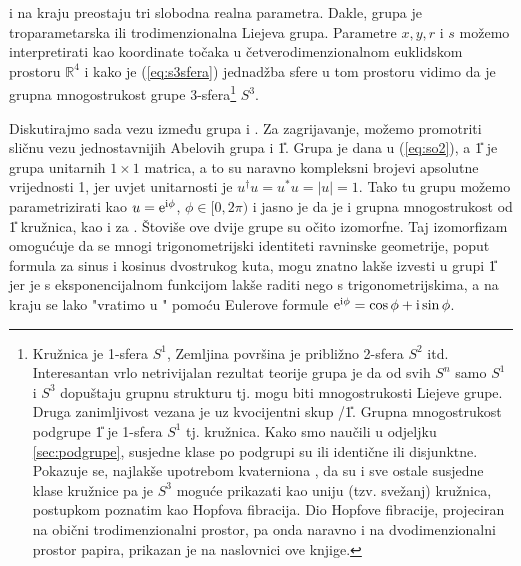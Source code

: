 i na kraju preostaju tri slobodna realna parametra. Dakle, grupa  je troparametarska
ili trodimenzionalna Liejeva grupa. Parametre $x, y, r$ i $s$ možemo interpretirati
kao koordinate točaka u četverodimenzionalnom euklidskom prostoru $\mathbb{R}^4$
i kako je (\ref{eq:s3sfera}) jednadžba sfere u tom prostoru vidimo da je
grupna mnogostrukost grupe  3-sfera\footnote{Kružnica je 1-sfera $S^1$,
    
    Zemljina površina je približno 2-sfera $S^2$ itd. Interesantan vrlo
    netrivijalan rezultat teorije grupa je da od svih $S^n$ samo $S^1$ i $S^3$ dopuštaju
grupnu strukturu tj. mogu biti mnogostrukosti Liejeve grupe.
Druga zanimljivost vezana je uz kvocijentni skup /\U{1}. Grupna mnogostrukost
podgrupe \U{1} je 1-sfera $S^1$ tj. kružnica. 
Kako smo naučili u odjeljku \ref{sec:podgrupe},
susjedne klase po podgrupi su ili identične ili disjunktne. Pokazuje se,
najlakše upotrebom kvaterniona \cite{Stilwell:2008}, da su i sve ostale
susjedne klase kružnice pa je $S^3$ moguće prikazati kao uniju (tzv. svežanj)
  
kružnica, postupkom poznatim kao Hopfova fibracija. Dio Hopfove fibracije,
projeciran na obični trodimenzionalni prostor, pa onda naravno i na
dvodimenzionalni prostor papira, prikazan je na naslovnici ove knjige.} $S^3$.


Diskutirajmo sada vezu između grupa  i . Za zagrijavanje, možemo
promotriti sličnu vezu jednostavnijih Abelovih grupa  i \U{1}. Grupa  je dana
u (\ref{eq:so2}), a \U{1} je grupa unitarnih $1 \times 1$ 
matrica, a to su naravno kompleksni brojevi apsolutne vrijednosti 1, jer uvjet
unitarnosti je $u^\dagger u = u^* u = |u| = 1$. Tako tu grupu možemo
parametrizirati kao $u = \textrm{e}^{\textrm{i}\phi}$, $\phi\in [0, 2\pi)$ i jasno je da je
i grupna mnogostrukost od \U{1} kružnica, kao i za . Štoviše ove dvije
grupe su očito izomorfne. Taj izomorfizam omogućuje da se mnogi
trigonometrijski identiteti ravninske geometrije, poput formula za sinus i kosinus dvostrukog kuta,
mogu znatno lakše izvesti u grupi \U{1} jer je s eksponencijalnom
funkcijom lakše raditi nego s trigonometrijskima, a na kraju se lako "vratimo
u " pomoću Eulerove formule $\textrm{e}^{\textrm{i}\phi} = \cos\phi + \textrm{i}\sin\phi$.

